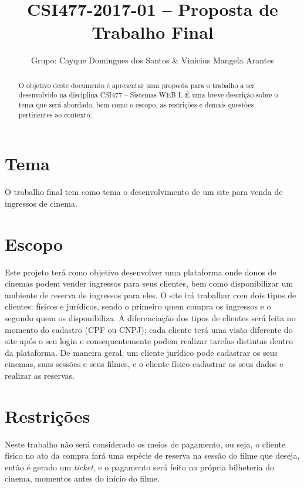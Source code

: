 \documentclass[10pt,a4paper,article]{abntex2}
\title{CSI477-2017-01 -- Proposta de Trabalho Final}
\author{Grupo: Cayque Domingues dos Santos \& Vinicius Mangela Arantes}
\begin{document}
	\maketitle

	\begin{abstract}
		O objetivo deste documento é apresentar uma proposta para o trabalho a ser desenvolvido na disciplina CSI477 -- Sistemas WEB I. É uma breve descrição sobre o tema que será abordado, bem como o escopo, as restrições e demais questões pertinentes ao contexto.
	\end{abstract}

	\section{Tema}

		O trabalho final tem como tema o desenvolvimento de um site para venda de ingressos de cinema.

	\section{Escopo}

		Este projeto terá como objetivo desenvolver uma plataforma onde donos de cinemas podem vender ingressos para seus clientes, bem como disponibilizar um ambiente de reserva de ingressos para eles. O site irá trabalhar com dois tipos de clientes: físicos e jurídicos, sendo o primeiro quem compra os ingressos e o segundo quem os disponibiliza. A diferenciação dos tipos de clientes será feita no momento do cadastro (CPF ou CNPJ); cada cliente terá uma visão diferente do site após o seu login e consequentemente podem realizar tarefas distintas dentro da plataforma. De maneira geral, um cliente jurídico pode cadastrar os seus cinemas, suas sessões e seus filmes, e o cliente físico cadastrar os seus dados e realizar as reservas. 

	\section{Restrições}

		Neste trabalho não será considerado os meios de pagamento, ou seja, o cliente físico no ato da compra fará uma espécie de reserva na sessão do filme que deseja, então é gerado um \textit{ticket}, e o pagamento será feito na própria bilheteria do cinema, momentos antes do início do filme.
\end{document}
